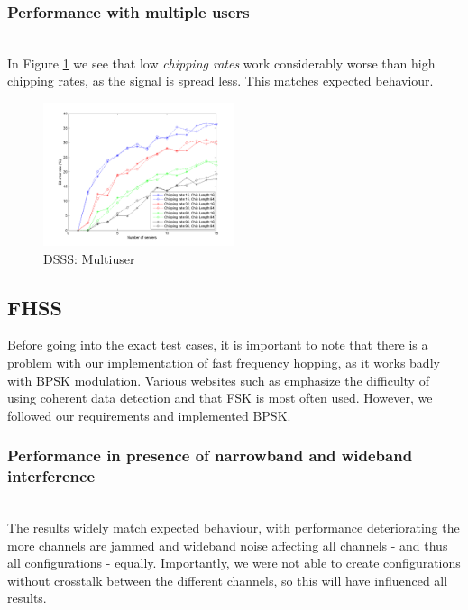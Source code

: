 		\subsubsection{Performance with multiple users}~\\
				
			In Figure \ref{fig:dsss_multiuser} we see that low \emph{chipping rates} work considerably worse than high chipping rates, as the signal is spread less.
			This matches expected behaviour.
				
			\begin{figure}[H]
			\centering
				\includegraphics[width=0.5\textwidth]{imgs/results/plot_mode_dsss-test_numSenders-rep_20-dataRate_8-dataLength_128.png}
				\caption{DSSS: Multiuser}
				\label{fig:dsss_multiuser}
			\end{figure}
	
	\subsection{FHSS}
		
		Before going into the exact test cases, it is important to note that there is a problem with our implementation of fast frequency hopping, as it works badly with BPSK modulation. Various websites such as \cite{web-nl} emphasize the difficulty of using coherent data detection and that FSK is most often used. However, we followed our requirements and implemented BPSK.
		
		\subsubsection{Performance in presence of narrowband and wideband interference}~\\
			The results widely match expected behaviour, with performance deteriorating the more channels are jammed and wideband noise affecting all channels - and thus all configurations - equally.
			Importantly, we were not able to create configurations without crosstalk between the different channels, so this will have influenced all results.
			
